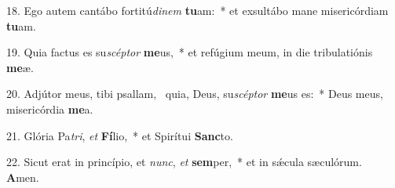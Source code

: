 18. Ego autem cantábo fortitú\textit{di}\textit{nem} \textbf{tu}am:~*  et exsultábo mane misericórdiam \textbf{tu}am.\

19. Quia factus es su\textit{scép}\textit{tor} \textbf{me}us,~*  et refúgium meum, in die tribulatiónis \textbf{me}æ.\

20. Adjútor meus, tibi psallam, \dag\  quia, Deus, su\textit{scép}\textit{tor} \textbf{me}us es:~*  Deus meus, misericórdia \textbf{me}a.\

21. Glória Pa\textit{tri}, \textit{et} \textbf{Fí}lio,~*  et Spirítui \textbf{Sanc}to.\

22. Sicut erat in princípio, et \textit{nunc}, \textit{et} \textbf{sem}per,~*  et in sǽcula sæculórum. \textbf{A}men.\

